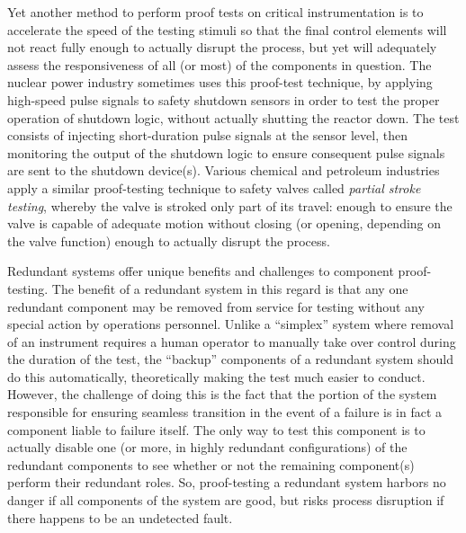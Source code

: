 Yet another method to perform proof tests on critical instrumentation is to accelerate the speed of the testing stimuli so that the final control elements will not react fully enough to actually disrupt the process, but yet will adequately assess the responsiveness of all (or most) of the components in question.  The nuclear power industry sometimes uses this proof-test technique, by applying high-speed pulse signals to safety shutdown sensors in order to test the proper operation of shutdown logic, without actually shutting the reactor down.  The test consists of injecting short-duration pulse signals at the sensor level, then monitoring the output of the shutdown logic to ensure consequent pulse signals are sent to the shutdown device(s).  Various chemical and petroleum industries apply a similar proof-testing technique to safety valves called \textit{partial stroke testing}, whereby the valve is stroked only part of its travel: enough to ensure the valve is capable of adequate motion without closing (or opening, depending on the valve function) enough to actually disrupt the process.      

\vskip 10pt

Redundant systems offer unique benefits and challenges to component proof-testing.  The benefit of a redundant system in this regard is that any one redundant component may be removed from service for testing without any special action by operations personnel.  Unlike a ``simplex'' system where removal of an instrument requires a human operator to manually take over control during the duration of the test, the ``backup'' components of a redundant system should do this automatically, theoretically making the test much easier to conduct.  However, the challenge of doing this is the fact that the portion of the system responsible for ensuring seamless transition in the event of a failure is in fact a component liable to failure itself.  The only way to test this component is to actually disable one (or more, in highly redundant configurations) of the redundant components to see whether or not the remaining component(s) perform their redundant roles.  So, proof-testing a redundant system harbors no danger if all components of the system are good, but risks process disruption if there happens to be an undetected fault.

